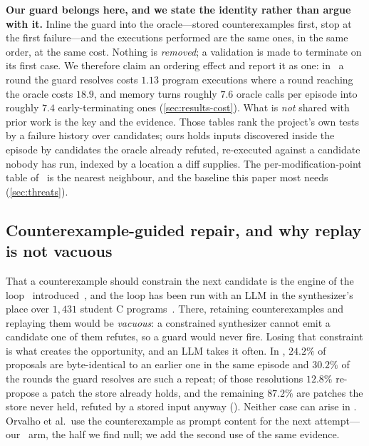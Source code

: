 \textbf{Our guard belongs here, and we state the identity rather than argue
with it.} Inline the guard into the oracle---stored counterexamples first, stop
at the first failure---and the executions performed are the same ones, in the
same order, at the same cost. Nothing is \emph{removed}; a validation is made
to terminate on its first case. We therefore claim an ordering effect and
report it as one: in \armtyped\ a round the guard resolves costs $1.13$
program executions where a round reaching the oracle costs $18.9$, and memory
turns roughly $7.6$ oracle calls per episode into roughly $7.4$
early-terminating ones (\cref{sec:results-cost}). What is \emph{not} shared with prior work is the key
and the evidence. Those tables rank the project's own tests by a failure
history over candidates; ours holds inputs discovered inside the episode by
candidates the oracle already refuted, re-executed against a candidate nobody
has run, indexed by a location a diff supplies. The per-modification-point
table of~\cite{venugopal2020modification} is the nearest neighbour, and the
baseline this paper most needs (\cref{sec:threats}).

\subsection{Counterexample-guided repair, and why replay is not vacuous}
\label{sec:related-cegis}
That a counterexample should constrain the next candidate is the engine of the
loop \Sketch\ introduced~\cite{solarlezama2006sketching}, and the loop has been
run with an LLM in the synthesizer's place over $1{,}431$ student C
programs~\cite{orvalho2025counterexample}. There, retaining counterexamples and
replaying them would be \emph{vacuous}: a constrained synthesizer cannot emit a
candidate one of them refutes, so a guard would never fire. Losing that
constraint is what creates the opportunity, and an LLM takes it often. In
\armguard, $24.2\%$ of proposals are byte-identical to an earlier one in the
same episode and $30.2\%$ of the rounds the guard resolves are such a repeat;
of those resolutions $12.8\%$ re-propose a patch the store already holds, and
the remaining $87.2\%$ are patches the store never held, refuted by a stored
input anyway (). Neither case can arise in
\Sketch. Orvalho et al.\ use the counterexample as
prompt content for the next attempt---our \armsteer\ arm, the half we find
null; we add the second use of the same evidence.

\ifsuppmatter\else\fi

